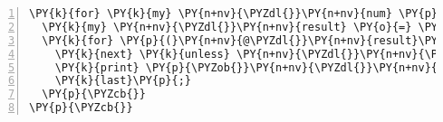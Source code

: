 \begin{Verbatim}[commandchars=\\\{\},numbers=left,firstnumber=1,stepnumber=1]
\PY{k}{for} \PY{k}{my} \PY{n+nv}{\PYZdl{}}\PY{n+nv}{num} \PY{p}{(} \PY{n+nv}{@}\PY{n+nv}{nums} \PY{p}{)} \PY{p}{\PYZob{}}
  \PY{k}{my} \PY{n+nv}{\PYZdl{}}\PY{n+nv}{result} \PY{o}{=} \PY{n}{for\PYZus{}number}\PY{p}{(}\PY{n+nv}{\PYZdl{}}\PY{n+nv}{num}\PY{p}{,} \PY{n+nv}{\PYZdl{}}\PY{n+nv}{use\PYZus{}acc}\PY{p}{)}\PY{p}{;}
  \PY{k}{for} \PY{p}{(}\PY{n+nv}{@\PYZdl{}}\PY{n+nv}{result}\PY{p}{)} \PY{p}{\PYZob{}}
    \PY{k}{next} \PY{k}{unless} \PY{n+nv}{\PYZdl{}}\PY{n+nv}{\PYZus{}}\PY{o}{-}\PY{o}{\PYZgt{}}\PY{p}{[}\PY{l+m+mi}{1}\PY{p}{]} \PY{o}{\PYZgt{}=} \PY{l+m+mf}{0.15}\PY{p}{;}
    \PY{k}{print} \PY{p}{\PYZob{}}\PY{n+nv}{\PYZdl{}}\PY{n+nv}{fh}\PY{p}{\PYZcb{}} \PY{n+nv}{\PYZdl{}}\PY{n+nv}{num} \PY{o}{.} \PY{l+s}{' '} \PY{o}{.} \PY{n+nb}{sqrt}\PY{p}{(} \PY{l+m+mi}{2} \PY{o}{*} \PY{n+nv}{\PYZdl{}}\PY{n+nv}{\PYZus{}}\PY{o}{-}\PY{o}{\PYZgt{}}\PY{p}{[}\PY{l+m+mi}{3}\PY{p}{]} \PY{p}{)} \PY{o}{*} \PY{l+m+mf}{1e3} \PY{o}{.} \PY{l+s}{' '} \PY{o}{.} \PY{n+nb}{sqrt}\PY{p}{(} \PY{l+m+mi}{2} \PY{o}{*} \PY{n+nv}{\PYZdl{}}\PY{n+nv}{\PYZus{}}\PY{o}{-}\PY{o}{\PYZgt{}}\PY{p}{[}\PY{l+m+mi}{4}\PY{p}{]} \PY{p}{)} \PY{o}{*} \PY{l+m+mf}{1e3} \PY{o}{.} \PY{l+s}{"\PYZbs{}n"}\PY{p}{;}
    \PY{k}{last}\PY{p}{;}
  \PY{p}{\PYZcb{}}
\PY{p}{\PYZcb{}}
\end{Verbatim}
